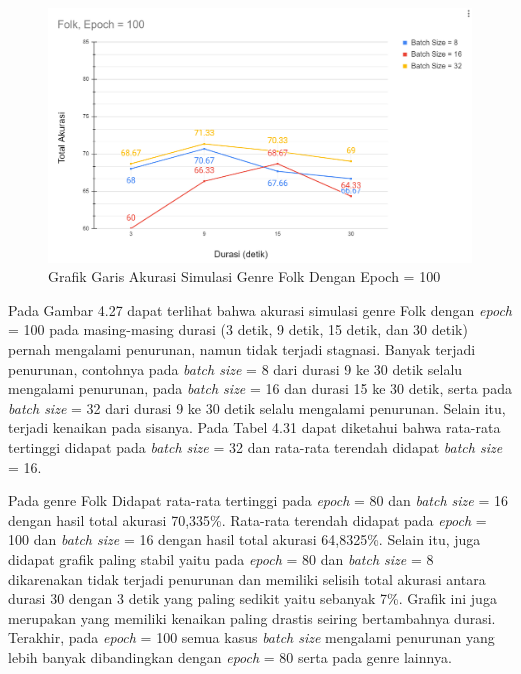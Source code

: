 \begin{enumerate}
		\begin{figure}[H]
			\centering
			
			\includegraphics[width=\textwidth]{gambar/e100_chart_sum accuracy_folk}
			
			\caption{Grafik Garis Akurasi Simulasi Genre Folk Dengan Epoch = 100}
			\label{fig:folksumcharte100}
		\end{figure}
		
		Pada Gambar 4.27 dapat terlihat bahwa akurasi simulasi genre Folk dengan \emph{epoch} = 100 pada masing-masing durasi (3 detik, 9 detik, 15 detik, dan 30 detik) pernah mengalami penurunan, namun tidak terjadi stagnasi. Banyak terjadi penurunan, contohnya pada \emph{batch size} = 8 dari durasi 9 ke 30 detik selalu mengalami penurunan, pada \emph{batch size} = 16 dan durasi 15 ke 30 detik, serta pada \emph{batch size} = 32 dari durasi 9 ke 30 detik selalu mengalami penurunan.  Selain itu, terjadi kenaikan pada sisanya. Pada Tabel 4.31 dapat diketahui bahwa rata-rata tertinggi didapat pada \emph{batch size} = 32 dan rata-rata terendah didapat \emph{batch size} = 16.
		
		Pada genre Folk Didapat rata-rata tertinggi pada \emph{epoch} = 80 dan \emph{batch size} = 16 dengan hasil total akurasi 70,335\%. Rata-rata terendah didapat pada \emph{epoch} = 100 dan \emph{batch size} = 16 dengan hasil total akurasi 64,8325\%. Selain itu, juga didapat grafik paling stabil yaitu pada \emph{epoch} = 80 dan \emph{batch size} = 8 dikarenakan tidak terjadi penurunan dan memiliki selisih total akurasi antara durasi 30 dengan 3 detik yang paling sedikit yaitu sebanyak 7\%. Grafik ini juga merupakan yang memiliki kenaikan paling drastis seiring bertambahnya durasi. Terakhir, pada \emph{epoch} = 100 semua kasus \emph{batch size} mengalami penurunan yang lebih banyak dibandingkan dengan \emph{epoch} = 80 serta pada genre lainnya. 
		
\end{enumerate}

